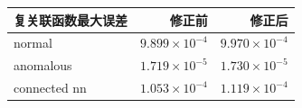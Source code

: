 \begin{tabular}{lrr}
\toprule
复关联函数最大误差 & 修正前 & 修正后 \\
\midrule
normal & $9.899\times10^{-4}$ & $9.970\times10^{-4}$ \\
anomalous & $1.719\times10^{-5}$ & $1.730\times10^{-5}$ \\
connected nn & $1.053\times10^{-4}$ & $1.119\times10^{-4}$ \\
\bottomrule
\end{tabular}
